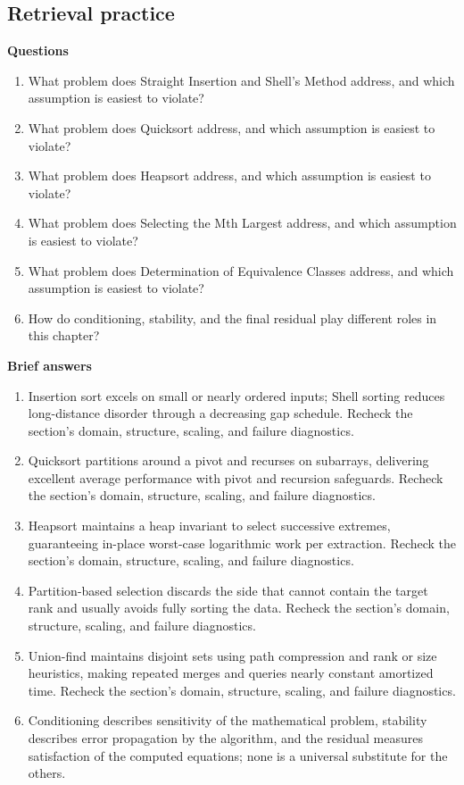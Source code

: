 \documentclass[10pt,letterpaper]{article}
\begin{document}
\subsection*{Retrieval practice}
\textbf{Questions}
\begin{enumerate}
\item What problem does Straight Insertion and Shell's Method address, and which assumption is easiest to violate?
\item What problem does Quicksort address, and which assumption is easiest to violate?
\item What problem does Heapsort address, and which assumption is easiest to violate?
\item What problem does Selecting the Mth Largest address, and which assumption is easiest to violate?
\item What problem does Determination of Equivalence Classes address, and which assumption is easiest to violate?
\item How do conditioning, stability, and the final residual play different roles in this chapter?
\end{enumerate}

\textbf{Brief answers}
\begin{enumerate}
\item Insertion sort excels on small or nearly ordered inputs; Shell sorting reduces long-distance disorder through a decreasing gap schedule. Recheck the section's domain, structure, scaling, and failure diagnostics.
\item Quicksort partitions around a pivot and recurses on subarrays, delivering excellent average performance with pivot and recursion safeguards. Recheck the section's domain, structure, scaling, and failure diagnostics.
\item Heapsort maintains a heap invariant to select successive extremes, guaranteeing in-place worst-case logarithmic work per extraction. Recheck the section's domain, structure, scaling, and failure diagnostics.
\item Partition-based selection discards the side that cannot contain the target rank and usually avoids fully sorting the data. Recheck the section's domain, structure, scaling, and failure diagnostics.
\item Union-find maintains disjoint sets using path compression and rank or size heuristics, making repeated merges and queries nearly constant amortized time. Recheck the section's domain, structure, scaling, and failure diagnostics.
\item Conditioning describes sensitivity of the mathematical problem, stability describes error propagation by the algorithm, and the residual measures satisfaction of the computed equations; none is a universal substitute for the others.
\end{enumerate}
\end{document}
